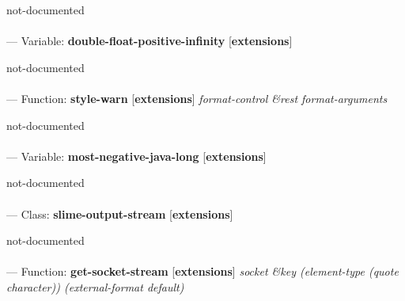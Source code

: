 \begin{adjustwidth}{5em}{5em}
not-documented
\end{adjustwidth}

\paragraph{}
\label{EXTENSIONS:DOUBLE-FLOAT-POSITIVE-INFINITY}
--- Variable: \textbf{double-float-positive-infinity} [\textbf{extensions}] \textit{}

\begin{adjustwidth}{5em}{5em}
not-documented
\end{adjustwidth}

\paragraph{}
\label{EXTENSIONS:STYLE-WARN}
--- Function: \textbf{style-warn} [\textbf{extensions}] \textit{format-control \&rest format-arguments}

\begin{adjustwidth}{5em}{5em}
not-documented
\end{adjustwidth}

\paragraph{}
\label{EXTENSIONS:MOST-NEGATIVE-JAVA-LONG}
--- Variable: \textbf{most-negative-java-long} [\textbf{extensions}] \textit{}

\begin{adjustwidth}{5em}{5em}
not-documented
\end{adjustwidth}

\paragraph{}
\label{EXTENSIONS:SLIME-OUTPUT-STREAM}
--- Class: \textbf{slime-output-stream} [\textbf{extensions}] \textit{}

\begin{adjustwidth}{5em}{5em}
not-documented
\end{adjustwidth}

\paragraph{}
\label{EXTENSIONS:GET-SOCKET-STREAM}
--- Function: \textbf{get-socket-stream} [\textbf{extensions}] \textit{socket \&key (element-type (quote character)) (external-format default)}

